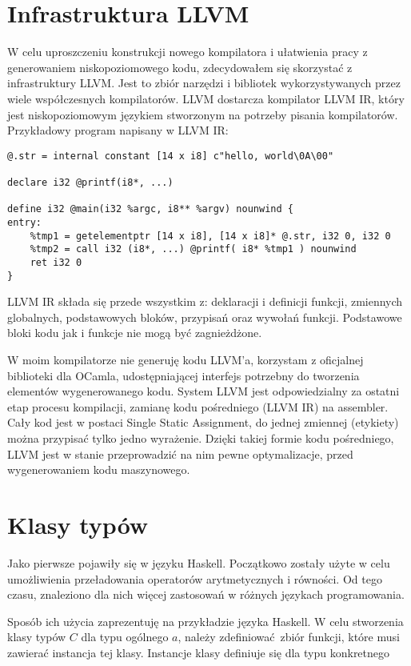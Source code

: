 \documentclass[declaration,shortabstract]{iithesis}
\begin{document}
\section{Infrastruktura LLVM}
W celu uproszczeniu konstrukcji nowego kompilatora i ułatwienia pracy z generowaniem 
niskopoziomowego kodu, zdecydowałem się skorzystać z infrastruktury LLVM. Jest to zbiór 
narzędzi i bibliotek wykorzystywanych przez wiele współczesnych kompilatorów. LLVM dostarcza 
kompilator LLVM IR, który jest niskopoziomowym językiem stworzonym na potrzeby pisania 
kompilatorów. Przykładowy program napisany w LLVM IR:

\begin{lstlisting}[frame=single]
@.str = internal constant [14 x i8] c"hello, world\0A\00"

declare i32 @printf(i8*, ...)

define i32 @main(i32 %argc, i8** %argv) nounwind {
entry:
    %tmp1 = getelementptr [14 x i8], [14 x i8]* @.str, i32 0, i32 0
    %tmp2 = call i32 (i8*, ...) @printf( i8* %tmp1 ) nounwind
    ret i32 0
}
\end{lstlisting}

LLVM IR składa się przede wszystkim z: deklaracji i definicji funkcji, zmiennych globalnych, 
podstawowych bloków, przypisań oraz wywołań funkcji. Podstawowe bloki kodu jak i funkcje nie 
mogą być zagnieżdżone. 

W moim kompilatorze nie generuję kodu LLVM'a, korzystam z oficjalnej biblioteki dla OCamla, 
udostępniającej interfejs potrzebny do tworzenia elementów wygenerowanego kodu. System LLVM 
jest odpowiedzialny za ostatni etap procesu kompilacji, zamianę kodu pośredniego (LLVM IR) na 
assembler. Cały kod jest w postaci Single Static Assignment, do jednej zmiennej (etykiety) 
można przypisać tylko jedno wyrażenie. Dzięki takiej formie kodu pośredniego, LLVM jest w 
stanie przeprowadzić na nim pewne optymalizacje, przed wygenerowaniem kodu maszynowego. 

\section{Klasy typów}

Jako pierwsze pojawiły się w języku Haskell. Początkowo zostały użyte w celu 
umożliwienia przeładowania operatorów arytmetycznych i równości. Od tego czasu, znaleziono dla nich więcej zastosowań w różnych językach programowania. 

Sposób ich użycia zaprezentuję na przykładzie języka Haskell. 
W celu stworzenia klasy typów $C$ dla typu ogólnego $a$, należy 
zdefiniować zbiór funkcji, które musi zawierać instancja tej klasy. Instancje 
klasy definiuje się dla typu konkretnego
\end{document}
